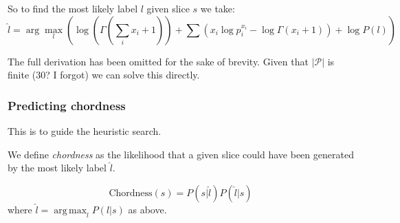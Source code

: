 \documentclass[12pt,a4paper,twoside,openright]{report}
\DeclareMathOperator*{\argmax}{arg\,max}
\theoremstyle{definition}
\begin{document}
So to find the most likely label $l$ given slice $s$ we take:
\begin{equation}
  \hat{l} = \arg\max_l \left(\log \left(\Gamma\left(\sum\limits_{i} x_i + 1\right) \right) 
                +  \sum\limits \left( x_i \log p_i^{x_i} - \log \Gamma (x_i + 1) \right) 
                +  \log P(l) \right)
  \label{eq:loglabsol}
\end{equation}


The full derivation has been omitted for the sake of brevity. Given that $|\mathcal{P}|$ is finite ($30$? I forgot) we can solve this directly. 

\subsubsection{Predicting chordness}
This is to guide the heuristic search.

We define \textit{chordness} as the likelihood that a given slice could have been generated by the most likely label $\hat{l}$.

\begin{equation}
  \text{Chordness}(s) = P(s | \hat{l}) P(\hat{l} | s) 
  \label{eq:chordness}
\end{equation}
where $\hat{l} = \argmax_l P(l | s)$ as above.

\end{document}
